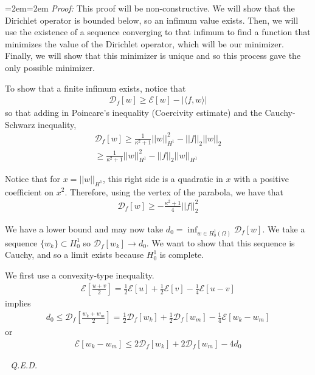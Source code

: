 \documentclass{article}
\newcommand{ \norm }[1]{{ || {#1}||}}
\newenvironment{pf}{%
	\par%
	\medskip
	\leftskip=2em\rightskip=2em%
	\noindent\ignorespaces \textit{Proof:} \newline}{%
	\,\, \newline \textit{Q.E.D.}\par\medskip}
\begin{document}
	\begin{pf}
		This proof will be non-constructive. We will show that the Dirichlet operator is bounded below, so an infimum value exists. Then, we will use the existence of a sequence converging to that infimum to find a function that minimizes the value of the Dirichlet operator, which will be our minimizer. Finally, we will show that this minimizer is unique and so this process gave the only possible minimizer. 
		
		
		To show that a finite infimum exists, notice that 
		\begin{align*}
			\mathcal{D}_{f}[w] \geq \mathcal{E}[w] - |\langle f,w\rangle |
		\end{align*}
		so that adding in Poincare's inequality (Coercivity estimate) and the Cauchy-Schwarz inequality,
		\begin{align*}
			\mathcal{D}_{f}[w] \geq \frac{1}{\kappa^{2}+1}\norm{w}_{H^{1}}^{2} - \norm{f}_{2}\norm{w}_{2}\\
			\geq \frac{1}{\kappa^{2}+1}\norm{w}_{H^{1}}^{2} - \norm{f}_{2}\norm{w}_{H^{1}}
		\end{align*}
		
		Notice that for $x = \norm{w}_{H^{1}}$, this right side is a quadratic in $x$ with a positive coefficient on $x^{2}$. Therefore, using the vertex of the parabola, we have that
		\begin{align*}
			\mathcal{D}_{f}[w] \geq -\frac{\kappa^{2}+1}{4} \norm{f}_{2}^{2}
		\end{align*}
		
		We have a lower bound and may now take $d_{0} = \inf_{w \in H^{1}_{0}(\Omega)} \mathcal{D}_{f}[w]$. We take a sequence $\{w_{k}\} \subset H^{1}_{0}$ so $\mathcal{D}_{f}[w_k] \to d_{0}$. We want to show that this sequence is Cauchy, and so a limit exists because $H^{1}_{0}$ is complete. 
		
		We first use a convexity-type inequality. 
		\begin{align*}
			\mathcal{E}[\frac{u+v}{2}] = \frac{1}{2}\mathcal{E}[u] + \frac{1}{2} \mathcal{E}[v] - \frac{1}{4} \mathcal{E}[u-v]
		\end{align*}
		implies 
		\begin{align*}
			d_0 \leq \mathcal{D}_{f}[\frac{w_k+w_m}{2}] = \frac{1}{2} \mathcal{D}_{f}[w_k] + \frac{1}{2} \mathcal{D}_{f}[w_m] - \frac{1}{4} \mathcal{E}[w_k-w_m]
		\end{align*}
		or 
		\begin{align*}
			\mathcal{E}[w_k - w_m] \leq 2\mathcal{D}_{f}[w_k] + 2 \mathcal{D}_{f}[w_m] - 4d_0
		\end{align*}
		

\end{pf}
\end{document}
